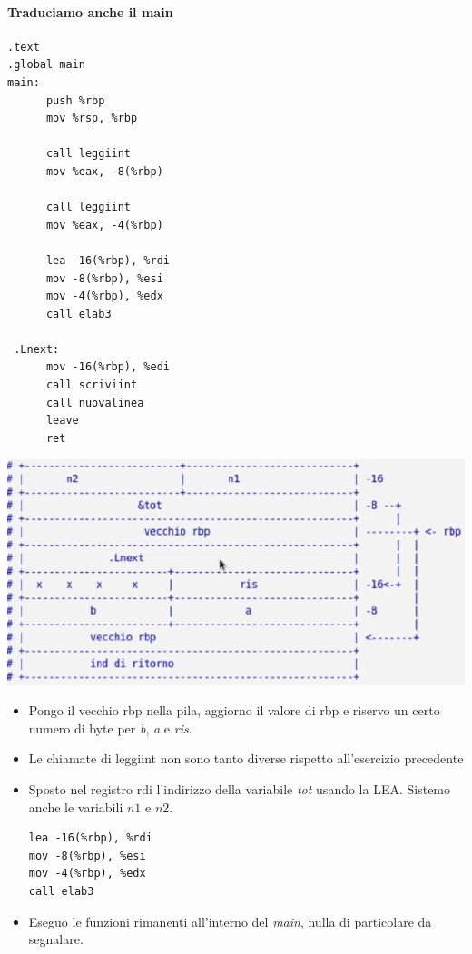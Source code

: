 \documentclass[11pt]{report}
\theoremstyle{definition}
\begin{document}
\paragraph{Traduciamo anche il main}
\begin{verbatim}
.text
.global main
main:
      push %rbp
      mov %rsp, %rbp
      
      call leggiint
      mov %eax, -8(%rbp)
      
      call leggiint
      mov %eax, -4(%rbp)   
      
      lea -16(%rbp), %rdi
      mov -8(%rbp), %esi
      mov -4(%rbp), %edx
      call elab3
      
 .Lnext:     
      mov -16(%rbp), %edi
      call scriviint
      call nuovalinea
      leave 
      ret
\end{verbatim}
\begin{center}
\includegraphics{img/36.PNG}
\end{center}
\begin{itemize}
\item Pongo il vecchio rbp nella pila, aggiorno il valore di rbp e riservo un certo numero di byte per \emph{b}, \emph{a} e \emph{ris}.
\item Le chiamate di leggiint non sono tanto diverse rispetto all'esercizio precedente
\item Sposto nel registro rdi l'indirizzo della variabile \emph{tot} usando la LEA. Sistemo anche le variabili $n1$ e $n2$.
\begin{verbatim}
lea -16(%rbp), %rdi 
mov -8(%rbp), %esi
mov -4(%rbp), %edx
call elab3
\end{verbatim}
\item Eseguo le funzioni rimanenti all'interno del \emph{main}, nulla di particolare da segnalare.
\end{itemize}
\end{document}
